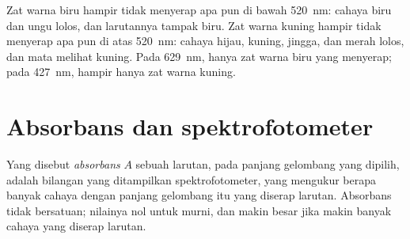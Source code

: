 \begin{remark}\label{rem:g11:absorbance:reading}
Zat warna biru hampir tidak menyerap apa pun di bawah \qty{520}{nm}:
cahaya biru dan ungu lolos, dan larutannya tampak biru. Zat warna kuning
hampir tidak menyerap apa pun di atas \qty{520}{nm}: cahaya hijau,
kuning, jingga, dan merah lolos, dan mata melihat kuning. Pada
\qty{629}{nm}, hanya zat warna biru yang menyerap; pada \qty{427}{nm},
hampir hanya zat warna kuning.
\end{remark}

\section{Absorbans dan spektrofotometer}

\begin{definition}[Absorbans]\label{def:g11:absorbance:absorbance}
Yang disebut \emph{absorbans} $A$ sebuah larutan, pada
panjang gelombang yang dipilih, adalah bilangan yang ditampilkan
spektrofotometer, yang mengukur berapa banyak cahaya dengan panjang
gelombang itu yang diserap larutan. Absorbans tidak bersatuan; nilainya
nol untuk  murni, dan makin besar jika makin banyak cahaya yang
diserap larutan.
\end{definition}

